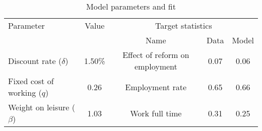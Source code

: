\begin{table}[htbp]\caption{Model parameters and fit}\label{table:model_param}\centering\footnotesize\begin{tabular}{lcccc} \toprule  Parameter & Value & \multicolumn{3}{c}{Target statistics}  \\\cline{3-5}  &  &  Name & Data & Model  \\\midrule    Discount rate ($\delta$)      &1.50\%& Effect of reform on employment   & 0.07 &0.06\\ Fixed cost of working ($q$)   &0.26& Employment rate                  & 0.65 &0.66\\ Weight on leisure ($\beta$)   &1.03& Work full time             & 0.31 &0.25\\  \bottomrule\end{tabular}\end{table}